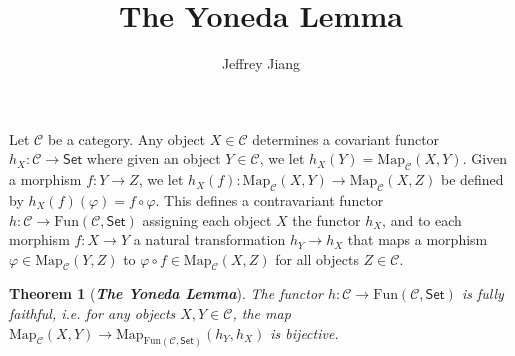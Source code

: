 \documentclass[psamsfonts, 12pt]{amsart}
\newtheorem{thm}{Theorem}[section]
\theoremstyle{definition}
\theoremstyle{remark}
\newcommand{\ib}[1]{\textbf{\textit{#1}}}
\begin{document}
%
\author{Jeffrey Jiang}
%
\title{The Yoneda Lemma}
%
\maketitle
%
Let $\mathcal{C}$ be a category. Any object $X \in \mathcal{C}$ determines a
covariant functor $h_X : \mathcal{C} \to \mathsf{Set}$ where given an object
$Y \in \mathcal{C}$, we let $h_X(Y) = \mathrm{Map}_\mathcal{C}(X,Y)$. Given a morphism
$f : Y \to Z$, we let
$h_X(f):\mathrm{Map}_{\mathcal{C}}(X,Y)\to\mathrm{Map}_{\mathcal{C}}(X,Z)$ be defined
by $h_X(f)(\varphi) = f \circ \varphi$. This defines a contravariant functor
$h : \mathcal{C} \to \mathrm{Fun}(\mathcal{C}, \mathsf{Set})$ assigning
each object $X$ the functor $h_X$, and to each morphism $f : X \to Y$ a natural
transformation $h_Y \to h_X$ that maps a morphism
$\varphi \in \mathrm{Map}_{\mathcal{C}}(Y,Z)$ to
$\varphi \circ f \in \mathrm{Map}_{\mathcal{C}}(X,Z)$
for all objects $Z \in \mathcal{C}$.
%
\begin{thm}[\ib{The Yoneda Lemma}]
The functor $h : \mathcal{C} \to \mathrm{Fun}(\mathcal{C}, \mathsf{Set})$ is
fully faithful, i.e. for any objects $X,Y \in \mathcal{C}$, the map
$\mathrm{Map}_\mathcal{C}(X,Y)\to
\mathrm{Map}_{\mathrm{Fun}(\mathcal{C},\mathsf{Set})}(h_Y, h_X)$ is bijective.
\end{thm}
%
\end{document}
